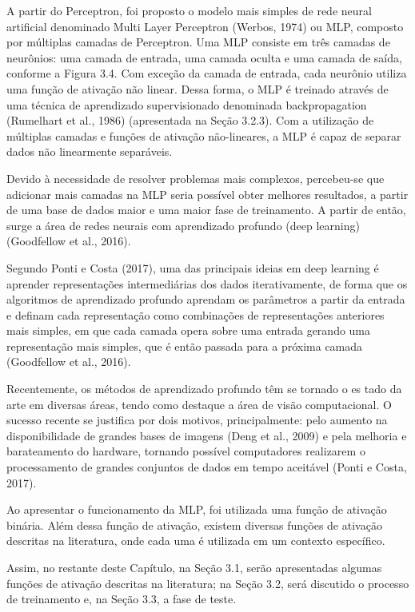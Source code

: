 A partir do Perceptron, foi proposto o modelo mais simples de rede neural artificial denominado Multi Layer Perceptron (Werbos, 1974) ou MLP, composto por múltiplas camadas de Perceptron. Uma MLP consiste em três camadas de neurônios: uma camada de entrada, uma camada oculta e uma camada de saída, conforme a Figura 3.4. Com exceção da camada de entrada, cada neurônio utiliza uma função de ativação não linear. Dessa forma, o MLP é treinado através de uma técnica de aprendizado supervisionado denominada backpropagation (Rumelhart et al., 1986) (apresentada na Seção 3.2.3). Com a utilização de múltiplas camadas e funções de ativação não-lineares, a MLP é capaz de separar dados não linearmente separáveis.

Devido à necessidade de resolver problemas mais complexos, percebeu-se que adicionar mais camadas na MLP seria possível obter melhores resultados, a partir de uma base de dados maior e uma maior fase de treinamento. A partir de então, surge a área de redes neurais com aprendizado profundo (deep learning) (Goodfellow et al., 2016).

Segundo Ponti e Costa (2017), uma das principais ideias em deep learning é aprender representações intermediárias dos dados iterativamente, de forma que os algoritmos de aprendizado profundo aprendam os parâmetros a partir da entrada e definam cada representação como combinações de representações anteriores mais simples, em que cada camada opera sobre uma entrada gerando uma representação mais simples, que é então passada para a próxima camada (Goodfellow et al., 2016).

Recentemente, os métodos de aprendizado profundo têm se tornado o es tado da arte em diversas áreas, tendo como destaque a área de visão computacional. O sucesso recente se justifica por dois motivos, principalmente: pelo aumento na disponibilidade de grandes bases de imagens (Deng et al., 2009) e pela melhoria e barateamento do hardware, tornando possível computadores realizarem o processamento de grandes conjuntos de dados em tempo aceitável (Ponti e Costa, 2017).

Ao apresentar o funcionamento da MLP, foi utilizada uma função de ativação binária. Além dessa função de ativação, existem diversas funções de ativação descritas na literatura, onde cada uma é utilizada em um contexto específico.

Assim, no restante deste Capítulo, na Seção 3.1, serão apresentadas algumas funções de ativação descritas na literatura; na Seção 3.2, será discutido o processo de treinamento e, na Seção 3.3, a fase de teste.


